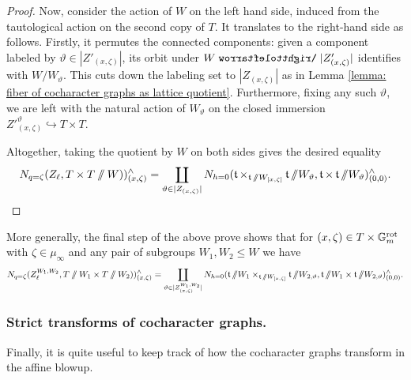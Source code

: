 \begin{proof}
Now, consider the action of $W$ on the left hand side, induced from the tautological action on the second copy of $T$. It translates to the right-hand side as follows. Firstly, it permutes the connected components: given a component labeled by $\vartheta \in |Z'_{(x, \zeta)}|$, its orbit under $W \acts |Z'_{(x, \zeta)}|$ identifies with $W/W_{\vartheta}$. This cuts down the labeling set to $|Z_{(x, \zeta)}|$ as in Lemma \ref{lemma: fiber of cocharacter graphs as lattice quotient}. Furthermore, fixing any such $\vartheta$, we are left with the natural action of $W_{\vartheta}$ on the closed immersion ${Z'}_{(x, \zeta)}^{\vartheta} \hookrightarrow T \times T$.

Altogether, taking the quotient by $W$ on both sides gives the desired equality
\begin{equation*}
    N_{q=\zeta}(Z_{\ell}, T \times T\sslash W))^{\wedge}_{(x, \zeta)} = \coprod_{\vartheta \in |Z_{(x, \zeta)}|} N_{h=0}(\operatorname{\mathfrak{t}} \times_{\operatorname{\mathfrak{t}} \sslash W_{[x, \zeta]}} \operatorname{\mathfrak{t}} \sslash W_{\vartheta}, \operatorname{\mathfrak{t}} \times \operatorname{\mathfrak{t}} \sslash W_{\vartheta})^{\wedge}_{(0, 0)}.
\end{equation*}
\end{proof}

\begin{remark}
More generally, the final step of the above prove shows that for $(x, \zeta) \in T \times \mathbb{G}_m^{\mathrm{rot}}$ with $\zeta \in \mu_{\infty}$ and any pair of subgroups $W_1, W_2 \leq W$ we have
\begin{equation*}
    N_{q=\zeta}(Z^{W_1, W_2}_{\ell}, T\sslash W_1 \times T\sslash W_2))^{\wedge}_{(x, \zeta)} = \coprod_{\vartheta \in |Z^{W_1, W_2}_{(x, \zeta)}|} N_{h=0}(\operatorname{\mathfrak{t}} \sslash W_1 \times_{\operatorname{\mathfrak{t}} \sslash W_{[x, \zeta]}} \operatorname{\mathfrak{t}} \sslash W_{2, \vartheta}, \operatorname{\mathfrak{t}} \sslash W_1 \times \operatorname{\mathfrak{t}} \sslash W_{2, \vartheta})^{\wedge}_{(0, 0)}.
\end{equation*}
\end{remark}


\subsubsection{Strict transforms of cocharacter graphs.}
Finally, it is quite useful to keep track of how the cocharacter graphs transform in the affine blowup.



